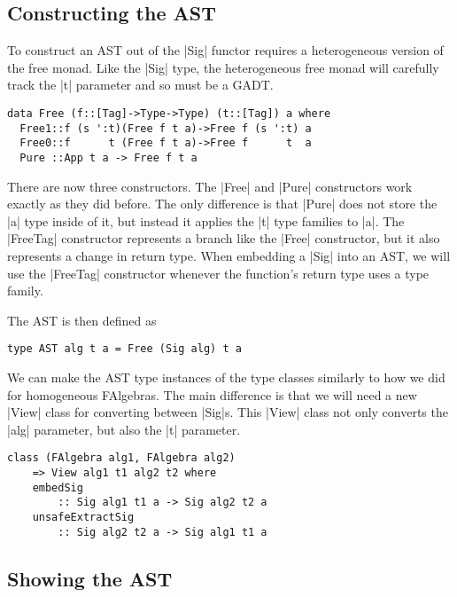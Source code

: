 \documentclass[preprint]{sigplanconf}
\theoremstyle{definition}
\begin{document}
\subsection{Constructing the AST}

To construct an AST out of the |Sig| functor requires a heterogeneous version of the free monad.
Like the |Sig| type, the heterogeneous free monad will carefully track the |t| parameter and so must be a GADT.
\begin{lstlisting}
data Free (f::[Tag]->Type->Type) (t::[Tag]) a where
  Free1::f (s ':t)(Free f t a)->Free f (s ':t) a
  Free0::f      t (Free f t a)->Free f      t  a
  Pure ::App t a -> Free f t a
\end{lstlisting}
There are now three constructors.
The |Free| and |Pure| constructors work exactly as they did before.
The only difference is that |Pure| does not store the |a| type inside of it,
but instead it applies the |t| type families to |a|.
The |FreeTag| constructor represents a branch like the |Free| constructor,
but it also represents a change in return type.
When embedding a |Sig| into an AST,
we will use the |FreeTag| constructor whenever the function's return type uses a type family.

The AST is then defined as
\begin{lstlisting}
type AST alg t a = Free (Sig alg) t a
\end{lstlisting}

We can make the AST type instances of the type classes similarly to how we did for homogeneous FAlgebras.
The main difference is that we will need a new |View| class for converting between |Sig|s.
This |View| class not only converts the |alg| parameter, but also the |t| parameter.
\begin{lstlisting}
class (FAlgebra alg1, FAlgebra alg2)
    => View alg1 t1 alg2 t2 where
    embedSig
        :: Sig alg1 t1 a -> Sig alg2 t2 a
    unsafeExtractSig
        :: Sig alg2 t2 a -> Sig alg1 t1 a
\end{lstlisting}


\subsection{Showing the AST}
\end{document}
